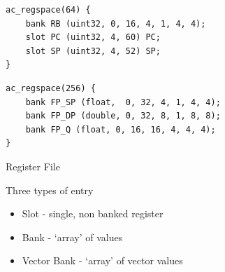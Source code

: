 \newsavebox{\codeboxone}
\begin{lrbox}{\codeboxone}
\begin{lstlisting}
ac_regspace(64) {
	bank RB (uint32, 0, 16, 4, 1, 4, 4);
	slot PC (uint32, 4, 60) PC;
	slot SP (uint32, 4, 52) SP;
}
\end{lstlisting}
\end{lrbox}

\newsavebox{\codeboxtwo}
\begin{lrbox}{\codeboxtwo}
\begin{lstlisting}
ac_regspace(256) {
	bank FP_SP (float,  0, 32, 4, 1, 4, 4);
	bank FP_DP (double, 0, 32, 8, 1, 8, 8);
	bank FP_Q (float, 0, 16, 16, 4, 4, 4);
}
\end{lstlisting}
\end{lrbox}

\begin{frame}{Register File}

Three types of entry
\begin{itemize}
\item Slot - single, non banked register
\item Bank - `array' of values
\item Vector Bank - `array' of vector values
\end{itemize}

\end{frame}

